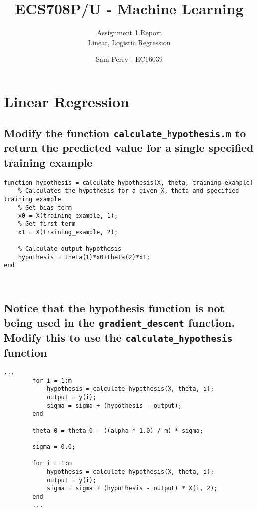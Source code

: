 \documentclass[titlepage]{scrartcl}
\newcommand{\code}[1]{\texttt{#1}}
\begin{document}
\title{ECS708P/U - Machine Learning}
\subtitle{\LARGE{Assignment 1 Report\\Linear, Logistic Regression}}
\author{Sam Perry - EC16039}

\maketitle

\section{Linear Regression}
\subsection{Modify the function \code{calculate\_hypothesis.m} to return the predicted value for a single specified training example}
\begin{lstlisting}
function hypothesis = calculate_hypothesis(X, theta, training_example)
    % Calculates the hypothesis for a given X, theta and specified training example
    % Get bias term
    x0 = X(training_example, 1);
    % Get first term
    x1 = X(training_example, 2);

    % Calculate output hypothesis
    hypothesis = theta(1)*x0+theta(2)*x1;
end
\end{lstlisting}\leavevmode \\

\subsection{Notice that the hypothesis function is not being used in the
\code{gradient\_descent} function. Modify this to use the
\code{calculate\_hypothesis} function}
\begin{lstlisting}[firstnumber=27]
        ...
        for i = 1:m
            hypothesis = calculate_hypothesis(X, theta, i);
            output = y(i);
            sigma = sigma + (hypothesis - output);
        end

        theta_0 = theta_0 - ((alpha * 1.0) / m) * sigma;

        sigma = 0.0;

        for i = 1:m
            hypothesis = calculate_hypothesis(X, theta, i);
            output = y(i);
            sigma = sigma + (hypothesis - output) * X(i, 2);
        end
        ...
\end{lstlisting}\leavevmode \\
 
\end{document}
